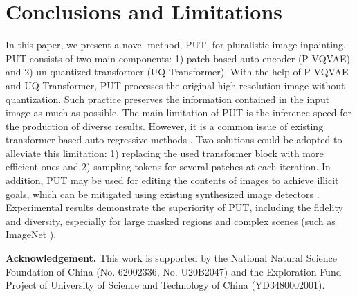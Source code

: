 \documentclass[10pt,twocolumn,letterpaper]{article}
\begin{document}
\section{Conclusions and Limitations}
\label{sec: conclusion} 
In this paper, we present a novel method, PUT, for pluralistic image inpainting. PUT consists of two main components: 1) patch-based auto-encoder (P-VQVAE) and 2) un-quantized transformer (UQ-Transformer). With the help of P-VQVAE and UQ-Transformer, PUT processes the original high-resolution image without quantization. Such practice preserves the information contained in the input image as much as possible. 
The main limitation of PUT is the inference speed for the production of diverse results. However, it is a common issue of existing transformer based auto-regressive methods \cite{vaswani2017attention, wan2021high, ramesh2021zero, esser2021taming}. Two solutions could be adopted to alleviate this limitation: 1) replacing the used transformer block with more efficient ones \cite{ho2019axial, wang2020linformer} and 2) sampling tokens for several patches at each iteration. 
In addition, PUT may be used for editing the contents of images to achieve illicit goals, which can be mitigated using existing synthesized image detectors \cite{wang2020cnn}.
Experimental results demonstrate the superiority of PUT, including the fidelity and diversity, especially for large masked regions and complex scenes (such as ImageNet \cite{deng2009imagenet}). 


\vspace{12pt}
\noindent\textbf{Acknowledgement.} 
This work is supported by the National Natural Science Foundation of China (No. 62002336, No. U20B2047) and the Exploration Fund Project of University of Science and Technology of China (YD3480002001).


{\small


}

\clearpage

\appendix

\end{document}
